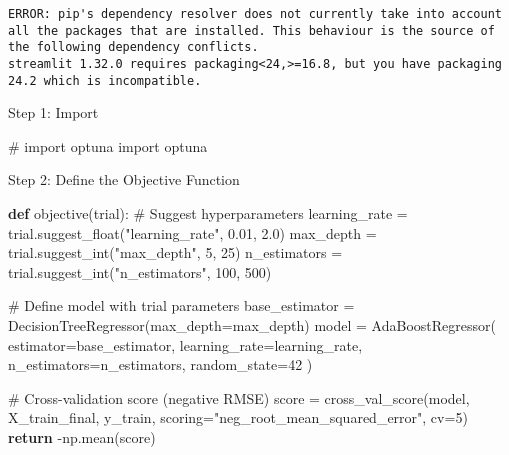\documentclass[
  letterpaper,
  DIV=11,
  numbers=noendperiod]{scrreprt}
\newenvironment{Shaded}{\begin{snugshade}}{\end{snugshade}}
\newcommand{\CommentTok}[1]{\textcolor[rgb]{0.37,0.37,0.37}{#1}}
\newcommand{\ControlFlowTok}[1]{\textcolor[rgb]{0.00,0.23,0.31}{\textbf{#1}}}
\newcommand{\DecValTok}[1]{\textcolor[rgb]{0.68,0.00,0.00}{#1}}
\newcommand{\FloatTok}[1]{\textcolor[rgb]{0.68,0.00,0.00}{#1}}
\newcommand{\ImportTok}[1]{\textcolor[rgb]{0.00,0.46,0.62}{#1}}
\newcommand{\KeywordTok}[1]{\textcolor[rgb]{0.00,0.23,0.31}{\textbf{#1}}}
\newcommand{\NormalTok}[1]{\textcolor[rgb]{0.00,0.23,0.31}{#1}}
\newcommand{\OperatorTok}[1]{\textcolor[rgb]{0.37,0.37,0.37}{#1}}
\newcommand{\StringTok}[1]{\textcolor[rgb]{0.13,0.47,0.30}{#1}}
\begin{document}
\begin{verbatim}
ERROR: pip's dependency resolver does not currently take into account all the packages that are installed. This behaviour is the source of the following dependency conflicts.
streamlit 1.32.0 requires packaging<24,>=16.8, but you have packaging 24.2 which is incompatible.
\end{verbatim}

Step 1: Import

\begin{Shaded}
\begin{Highlighting}[]
\CommentTok{\# import optuna}
\ImportTok{import}\NormalTok{ optuna}
\end{Highlighting}
\end{Shaded}

Step 2: Define the Objective Function

\begin{Shaded}
\begin{Highlighting}[]
\KeywordTok{def}\NormalTok{ objective(trial):}
    \CommentTok{\# Suggest hyperparameters}
\NormalTok{    learning\_rate }\OperatorTok{=}\NormalTok{ trial.suggest\_float(}\StringTok{"learning\_rate"}\NormalTok{, }\FloatTok{0.01}\NormalTok{, }\FloatTok{2.0}\NormalTok{)}
\NormalTok{    max\_depth }\OperatorTok{=}\NormalTok{ trial.suggest\_int(}\StringTok{"max\_depth"}\NormalTok{, }\DecValTok{5}\NormalTok{, }\DecValTok{25}\NormalTok{)}
\NormalTok{    n\_estimators }\OperatorTok{=}\NormalTok{ trial.suggest\_int(}\StringTok{"n\_estimators"}\NormalTok{, }\DecValTok{100}\NormalTok{, }\DecValTok{500}\NormalTok{)}

    \CommentTok{\# Define model with trial parameters}
\NormalTok{    base\_estimator }\OperatorTok{=}\NormalTok{ DecisionTreeRegressor(max\_depth}\OperatorTok{=}\NormalTok{max\_depth)}
\NormalTok{    model }\OperatorTok{=}\NormalTok{ AdaBoostRegressor(}
\NormalTok{        estimator}\OperatorTok{=}\NormalTok{base\_estimator,}
\NormalTok{        learning\_rate}\OperatorTok{=}\NormalTok{learning\_rate,}
\NormalTok{        n\_estimators}\OperatorTok{=}\NormalTok{n\_estimators,}
\NormalTok{        random\_state}\OperatorTok{=}\DecValTok{42}
\NormalTok{    )}

    \CommentTok{\# Cross{-}validation score (negative RMSE)}
\NormalTok{    score }\OperatorTok{=}\NormalTok{ cross\_val\_score(model, X\_train\_final, y\_train, scoring}\OperatorTok{=}\StringTok{"neg\_root\_mean\_squared\_error"}\NormalTok{, cv}\OperatorTok{=}\DecValTok{5}\NormalTok{)}
    \ControlFlowTok{return} \OperatorTok{{-}}\NormalTok{np.mean(score)}
\end{Highlighting}
\end{Shaded}
\end{document}
